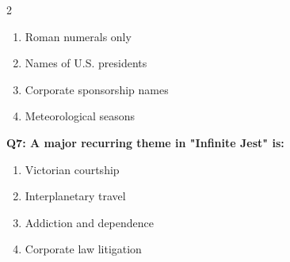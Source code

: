 \documentclass[10pt]{article}
\begin{document}
\begin{multicols}{2}
\begin{enumerate}[label=\arabic*.]
\item Roman numerals only
\item Names of U.S. presidents
\item Corporate sponsorship names
\item Meteorological seasons
\end{enumerate}
\textbf{Q7: A major recurring theme in "Infinite Jest" is:}

\begin{enumerate}[label=\arabic*.]
\item Victorian courtship
\item Interplanetary travel
\item Addiction and dependence
\item Corporate law litigation
\end{enumerate}
\end{multicols}

\newpage
\end{document}
